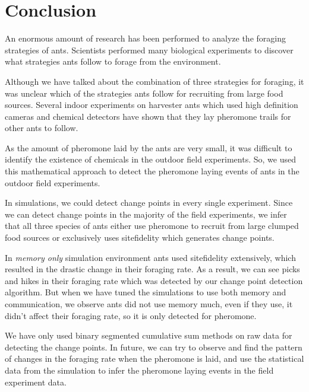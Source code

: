 \chapter{Conclusion}
An enormous amount of research has been performed to analyze the foraging strategies of ants. Scientists performed many biological experiments to discover what strategies ants follow to forage from the environment. \par
Although we have talked about the combination of three strategies for foraging, it was unclear which of the strategies ants follow for recruiting from large food sources. Several indoor experiments on harvester ants which used high definition cameras and chemical detectors have shown that they lay pheromone trails for other ants to follow. \par
As the amount of pheromone laid by the ants are very small, it was difficult to identify the existence of chemicals in the outdoor field experiments. So, we used this mathematical approach to detect the pheromone laying events of ants in the outdoor field experiments. \par
In simulations, we could detect change points in every single experiment.
Since we can detect change points in the majority of the field experiments, we infer that all three species of ants either use pheromone to recruit from large clumped food sources or exclusively uses sitefidelity which generates change points. \par
In \textit{memory only} simulation environment ants used sitefidelity extensively, which resulted in the drastic change in their foraging rate. As a result, we can see picks and hikes in their foraging rate which was detected by our change point detection algorithm. But when we have tuned the simulations to use both memory and communication, we observe ants did not use memory much, even if they use, it didn’t affect their foraging rate, so it is only detected for pheromone.\par

We have only used binary segmented cumulative sum methods on raw data for detecting the change points. In future, we can try to observe and find the pattern of changes in the foraging rate when the pheromone is laid, and use the statistical data from the simulation to infer the pheromone laying events in the field experiment data.
